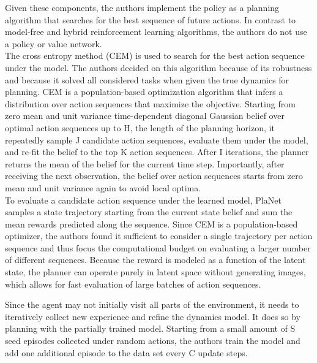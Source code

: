 Given these components, the authors implement the policy as a planning algorithm that searches for the best sequence of future actions. In contrast to model-free and hybrid reinforcement learning algorithms, the authors do not use a policy or value network. \\
The cross entropy method \cite{Algo.CEM} (CEM) is used to search for the best action sequence under the model. The authors decided on this algorithm because of its robustness and because it solved all considered tasks when given the true dynamics for planning. CEM is a population-based optimization algorithm that infers a distribution over action sequences that maximize the objective. Starting from zero mean and unit variance time-dependent diagonal Gaussian belief over optimal action sequences up to H, the length of the planning horizon, it repeatedly sample J candidate action sequences, evaluate them under the model, and re-fit the belief to the top K action sequences. After I iterations, the planner returns the mean of the belief for the current time step. Importantly, after receiving the next observation, the belief over action sequences starts from zero mean and unit variance again to avoid local optima. \\
To evaluate a candidate action sequence under the learned model, PlaNet samples a state trajectory starting from the current state belief and sum the mean rewards predicted along the sequence. Since CEM is a population-based optimizer, the authors found it sufficient to consider a single trajectory per action sequence and thus focus the computational budget on evaluating a larger number of different sequences. Because the reward is modeled as a function of the latent state, the planner can operate purely in latent space without generating images, which allows for fast evaluation of large batches of action sequences.

Since the agent may not initially visit all parts of the environment, it needs to iteratively collect new experience and refine the dynamics model. It does so by planning with the partially trained model. Starting from a small amount of S seed episodes collected under random actions, the authors train the model and add one additional episode to the data set every C update steps.

